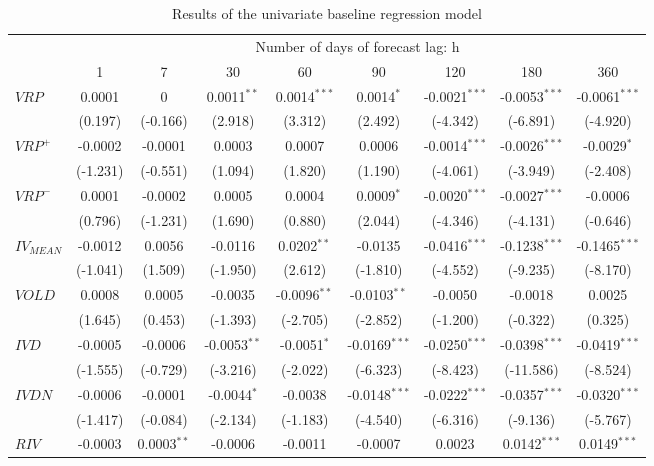 \documentclass[a4paper, 12pt]{article}    %
\begin{document}
      
\begin{table}[htbp]
\centering
\footnotesize %
\caption{Results of the univariate baseline regression model}
\label{result1}
\renewcommand{\arraystretch}{1.3} %
\begin{tabular}{lcccccccc}
\toprule
&\multicolumn{8}{c}{Number of days of forecast lag: h}\\
\cmidrule(lr){2-9}
& 1    & 7    & 30   &  60  & 90   & 120  & 180  & 360 \\
\midrule
$VRP$ &0.0001 & 0 & 0.0011$^{**}$ & 0.0014$^{***}$ & 0.0014$^{*}$ & -0.0021$^{***}$ & -0.0053$^{***}$ & -0.0061$^{***}$  \\
&(0.197) & (-0.166) & (2.918) & (3.312) & (2.492) & (-4.342) & (-6.891) & (-4.920) \\
$VRP^+$ &-0.0002 & -0.0001 & 0.0003 & 0.0007 & 0.0006 & -0.0014$^{***}$ & -0.0026$^{***}$ & -0.0029$^{*}$  \\
&(-1.231) & (-0.551) & (1.094) & (1.820) & (1.190) & (-4.061) & (-3.949) & (-2.408) \\
$VRP^-$ &0.0001 & -0.0002 & 0.0005 & 0.0004 & 0.0009$^{*}$ & -0.0020$^{***}$ & -0.0027$^{***}$ & -0.0006  \\
&(0.796) & (-1.231) & (1.690) & (0.880) & (2.044) & (-4.346) & (-4.131) & (-0.646) \\
$IV_{MEAN}$ &-0.0012 & 0.0056 & -0.0116 & 0.0202$^{**}$ & -0.0135 & -0.0416$^{***}$ & -0.1238$^{***}$ & -0.1465$^{***}$  \\
&(-1.041) & (1.509) & (-1.950) & (2.612) & (-1.810) & (-4.552) & (-9.235) & (-8.170) \\
$VOLD$ &0.0008 & 0.0005 & -0.0035 & -0.0096$^{**}$ & -0.0103$^{**}$ & -0.0050 & -0.0018 & 0.0025  \\
&(1.645) & (0.453) & (-1.393) & (-2.705) & (-2.852) & (-1.200) & (-0.322) & (0.325) \\
$IVD$ &-0.0005 & -0.0006 & -0.0053$^{**}$ & -0.0051$^{*}$ & -0.0169$^{***}$ & -0.0250$^{***}$ & -0.0398$^{***}$ & -0.0419$^{***}$  \\
&(-1.555) & (-0.729) & (-3.216) & (-2.022) & (-6.323) & (-8.423) & (-11.586) & (-8.524) \\
$IVDN$ & -0.0006& -0.0001 & -0.0044$^{*}$ & -0.0038 & -0.0148$^{***}$ & -0.0222$^{***}$ & -0.0357$^{***}$ & -0.0320$^{***}$ \\
&(-1.417) & (-0.084) & (-2.134) & (-1.183) & (-4.540) & (-6.316) & (-9.136) & (-5.767) \\
$RIV$ &-0.0003 & 0.0003$^{**}$ & -0.0006 & -0.0011 & -0.0007 & 0.0023 & 0.0142$^{***}$ & 0.0149$^{***}$  \\

\end{tabular}
\end{table}
\end{document}

